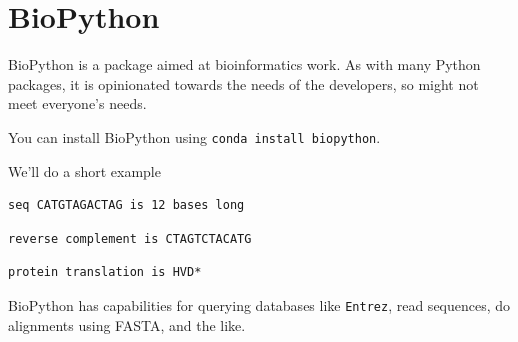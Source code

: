 \documentclass[
  letterpaper,
]{scrbook}
\newenvironment{Shaded}{\begin{snugshade}}{\end{snugshade}}
\newcommand{\BuiltInTok}[1]{#1}
\newcommand{\CommentTok}[1]{\textcolor[rgb]{0.56,0.35,0.01}{\textit{#1}}}
\newcommand{\ImportTok}[1]{#1}
\newcommand{\NormalTok}[1]{#1}
\newcommand{\OperatorTok}[1]{\textcolor[rgb]{0.81,0.36,0.00}{\textbf{#1}}}
\newcommand{\SpecialCharTok}[1]{\textcolor[rgb]{0.00,0.00,0.00}{#1}}
\newcommand{\StringTok}[1]{\textcolor[rgb]{0.31,0.60,0.02}{#1}}
\begin{document}
\hypertarget{biopython}{%
\chapter{BioPython}\label{biopython}}

BioPython is a package aimed at bioinformatics work. As with many Python packages, it is opinionated towards the needs of the developers, so might not meet everyone's needs.

You can install BioPython using \texttt{conda\ install\ biopython}.

We'll do a short example

\begin{Shaded}
\end{Shaded}

\begin{verbatim}
seq CATGTAGACTAG is 12 bases long
\end{verbatim}

\begin{Shaded}
\end{Shaded}

\begin{verbatim}
reverse complement is CTAGTCTACATG
\end{verbatim}

\begin{Shaded}
\end{Shaded}

\begin{verbatim}
protein translation is HVD*
\end{verbatim}

BioPython has capabilities for querying databases like \texttt{Entrez}, read sequences, do alignments using FASTA, and the like.
\end{document}

